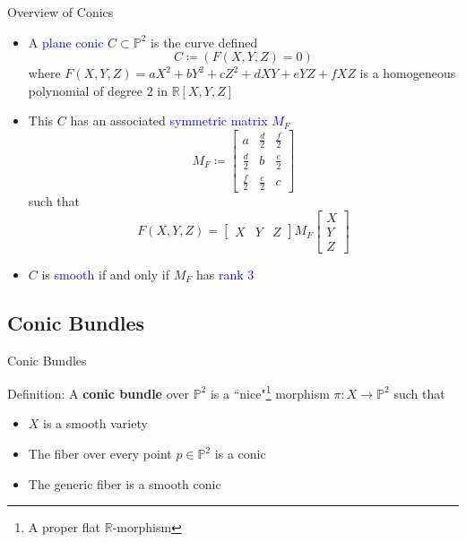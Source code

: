 \documentclass[hyperref, notheorems]{beamer}
\newcommand{\Rbb}{\mathbb{R}}
\newcommand{\Pbb}{\mathbb{P}}
\newcommand{\txtblue}{\textcolor{blue}}
\theoremstyle{definition}
\begin{document}
\begin{frame}{Overview of Conics}
    \begin{itemize}
        \item A \txtblue{plane conic} $C \subset \Pbb^2$ is the curve defined 
        \[C \coloneqq (F(X, Y, Z) = 0)\]
        where $F(X, Y, Z) = a X^2 + b Y^2 + c Z^2 + d XY + e YZ + f XZ$ is a homogeneous polynomial of degree $2$ in $\Rbb[X, Y, Z]$ 
        \item This $C$ has an associated \txtblue{symmetric matrix $M_F$}
        \[M_F \coloneqq \begin{bmatrix}
        a & \frac{d}{2} & \frac{f}{2}\\
        \frac{d}{2} & b & \frac{e}{2}\\
        \frac{f}{2} & \frac{e}{2} & c
        \end{bmatrix}\]
        such that
        \[F(X, Y, Z) = \begin{bmatrix} 
        X & Y & Z
        \end{bmatrix}
        M_F
        \begin{bmatrix} 
        X\\
        Y\\
        Z
        \end{bmatrix}\]
        \item $C$ is \txtblue{smooth} if and only if $M_F$ has \txtblue{rank $3$}
    \end{itemize}
\end{frame}

    \subsection{Conic Bundles}
    
\begin{frame}{Conic Bundles}
    
\begin{block}{Definition:}
A \textbf{conic bundle} over $\Pbb^2$ is a ``nice"\footnote{A proper flat $\Rbb$-morphism} morphism $\pi: X \to \Pbb^2$ such that 
\begin{itemize}
    \item $X$ is a smooth variety
    \item The fiber over every point $p \in \Pbb^2$ is a conic
    \item The generic fiber is a smooth conic
\end{itemize}
\end{block}
\end{frame}
\end{document}
